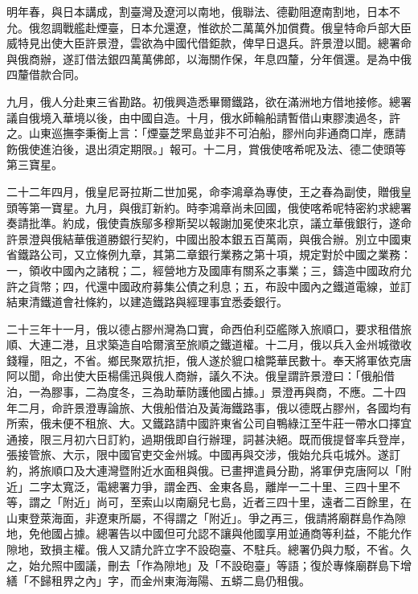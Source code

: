 \begin{pinyinscope}
明年春，與日本講成，割臺灣及遼河以南地，俄聯法、德勸阻遼南割地，日本不允。俄忽調戰艦赴煙臺，日本允還遼，惟欲於二萬萬外加償費。俄皇特命戶部大臣威特見出使大臣許景澄，雲欲為中國代借鉅款，俾早日退兵。許景澄以聞。總署命與俄商辦，遂訂借法銀四萬萬佛郎，以海關作保，年息四釐，分年償還。是為中俄四釐借款合同。

九月，俄人分赴東三省勘路。初俄興造悉畢爾鐵路，欲在滿洲地方借地接修。總署議自俄境入華境以後，由中國自造。十月，俄水師輪船請暫借山東膠澳過冬，許之。山東巡撫李秉衡上言：「煙臺芝罘島並非不可泊船，膠州向非通商口岸，應請飭俄使進泊後，退出須定期限。」報可。十二月，賞俄使喀希呢及法、德二使頭等第三寶星。

二十二年四月，俄皇尼哥拉斯二世加冕，命李鴻章為專使，王之春為副使，贈俄皇頭等第一寶星。九月，與俄訂新約。時李鴻章尚未回國，俄使喀希呢特密約求總署奏請批準。約成，俄使貴族鄔多穆斯契以報謝加冕使來北京，議立華俄銀行，遂命許景澄與俄結華俄道勝銀行契約，中國出股本銀五百萬兩，與俄合辦。別立中國東省鐵路公司，又立條例九章，其第二章銀行業務之第十項，規定對於中國之業務：一，領收中國內之諸稅；二，經營地方及國庫有關系之事業；三，鑄造中國政府允許之貨幣；四，代還中國政府募集公債之利息；五，布設中國內之鐵道電線，並訂結東清鐵道會社條約，以建造鐵路與經理事宜悉委銀行。

二十三年十一月，俄以德占膠州灣為口實，命西伯利亞艦隊入旅順口，要求租借旅順、大連二港，且求築造自哈爾濱至旅順之鐵道權。十二月，俄以兵入金州城徵收錢糧，阻之，不省。鄉民聚眾抗拒，俄人遂於貔口槍斃華民數十。奉天將軍依克唐阿以聞，命出使大臣楊儒迅與俄人商辦，議久不決。俄皇謂許景澄曰：「俄船借泊，一為膠事，二為度冬，三為助華防護他國占據。」景澄再與商，不應。二十四年二月，命許景澄專論旅、大俄船借泊及黃海鐵路事，俄以德既占膠州，各國均有所索，俄未便不租旅、大。又鐵路請中國許東省公司自鴨綠江至牛莊一帶水口擇宜通接，限三月初六日訂約，過期俄即自行辦理，詞甚決絕。既而俄提督率兵登岸，張接管旅、大示，限中國官吏交金州城。中國再與交涉，俄始允兵屯城外。遂訂約，將旅順口及大連灣暨附近水面租與俄。已畫押遣員分勘，將軍伊克唐阿以「附近」二字太寬泛，電總署力爭，謂金西、金東各島，離岸一二十里、三四十里不等，謂之「附近」尚可，至索山以南廟兒七島，近者三四十里，遠者二百餘里，在山東登萊海面，非遼東所屬，不得謂之「附近」。爭之再三，俄請將廟群島作為隙地，免他國占據。總署告以中國但可允認不讓與他國享用並通商等利益，不能允作隙地，致損主權。俄人又請允許立字不設砲臺、不駐兵。總署仍與力駁，不省。久之，始允照中國議，刪去「作為隙地」及「不設砲臺」等語；復於專條廟群島下增繕「不歸租界之內」字，而金州東海海陽、五蟒二島仍租俄。


\end{pinyinscope}
